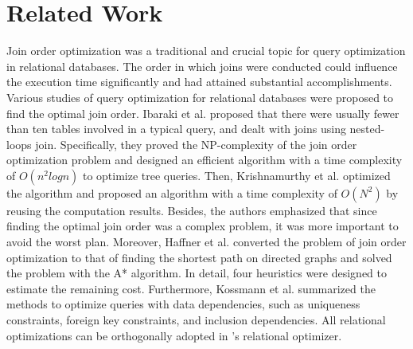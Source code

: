 \section{Related Work}
\label{sec:related-work}


 Join order optimization was a traditional and crucial topic for query optimization in relational databases. The order in which joins were conducted could influence the execution time significantly and had attained substantial accomplishments. Various studies of query optimization for relational databases were proposed to find the optimal join order. Ibaraki et al.\cite{nested-tods-1984} proposed that there were usually fewer than ten tables involved in a typical query, and dealt with joins using nested-loops join. Specifically, they proved the NP-complexity of the join order optimization problem and designed an efficient algorithm with a time complexity of $O(n^2logn)$ to optimize tree queries. Then, Krishnamurthy et al.\cite{optimize-nested-vldb-1986} optimized the algorithm and proposed an algorithm with a time complexity of $O(N^2)$ by reusing the computation results. Besides, the authors emphasized that since finding the optimal join order was a complex problem, it was more important to avoid the worst plan. Moreover, Haffner et al.\cite{astarjoin} converted the problem of join order optimization to that of finding the shortest path on directed graphs and solved the problem with the A* algorithm. In detail, four heuristics were designed to estimate the remaining cost. Furthermore, Kossmann et al.\cite{data-dependency-join} summarized the methods to optimize queries with data dependencies, such as uniqueness constraints, foreign key constraints, and inclusion dependencies.
All relational optimizations can be orthogonally adopted in \name's relational optimizer.

